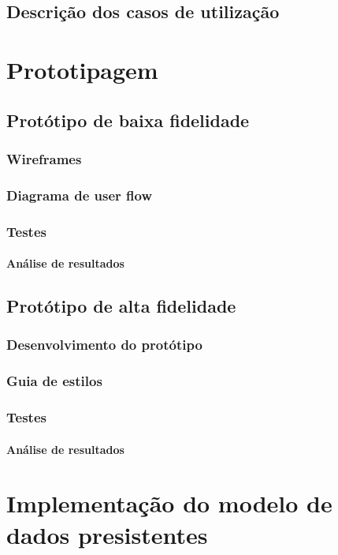 \documentclass[11pt, twoside]{report}
\begin{document}
	\section{Descrição dos casos de utilização}
	
	\chapter{Prototipagem}
	\section{Protótipo de baixa fidelidade}
	\subsection{Wireframes}
	\subsection{Diagrama de user flow}
	\subsection{Testes}
	\subsubsection{Análise de resultados}
	
	\section{Protótipo de alta fidelidade}
	\subsection{Desenvolvimento do protótipo}
	\subsection{Guia de estilos}
	\subsection{Testes}
	\subsubsection{Análise de resultados}
	
	\chapter{Implementação do modelo de dados presistentes}
\end{document}
